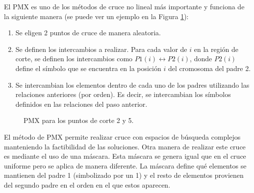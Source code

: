 El PMX es uno de los métodos de cruce no lineal más importante y funciona de la siguiente manera (se puede ver un ejemplo en la Figura \ref{fig:PMX}):
\begin{enumerate}
    \item Se eligen 2 puntos de cruce de manera aleatoria.
    \item Se definen los intercambios a realizar. Para cada valor de $i$ en la región de corte, se definen los intercambios como $P1(i)\leftrightarrow P2(i)$, donde $P2(i)$ define el símbolo que se encuentra en la posición $i$ del cromosoma del padre 2. 
    \item Se intercambian los elementos dentro de cada uno de los padres utilizando las relaciones anteriores (por orden). Es decir, se intercambian los símbolos definidos en las relaciones del paso anterior.
\end{enumerate}

\begin{figure}[t]
    \centering
    \caption{PMX para los puntos de corte 2 y 5.}
    \label{fig:PMX}
\end{figure}

El método de PMX permite realizar cruce con espacios de búsqueda complejos manteniendo la factibilidad de las soluciones. Otra manera de realizar este cruce es mediante el uso de una máscara. Esta máscara se genera igual que en el cruce uniforme pero se aplica de manera diferente. La máscara define qué elementos se mantienen del padre 1 (simbolizado por un 1) y el resto de elementos provienen del segundo padre en el orden en el que estos aparecen.\\

